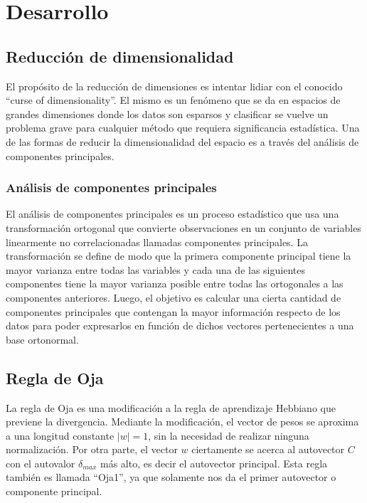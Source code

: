 \documentclass[informe.tex]{subfiles}
\begin{document}
  
  \section{Desarrollo}
    \subsection{Reducción de dimensionalidad}
	El propósito de la reducción de dimensiones es intentar lidiar con el conocido ``curse of dimensionality''. El mismo es un fenómeno que se da en espacios de grandes dimensiones donde los datos son esparsos y clasificar se vuelve un problema grave para cualquier método que requiera significancia estadística. Una de las formas de reducir la dimensionalidad del espacio es a través del análisis de componentes principales.
    
      \subsubsection{Análisis de componentes principales}
	El an\'alisis de componentes principales es un proceso estadístico que usa una transformaci\'on ortogonal que convierte observaciones en un conjunto de variables linearmente no correlacionadas llamadas componentes principales. La transformación se define de modo que la primera componente principal tiene la mayor varianza entre todas las variables y cada una de las siguientes componentes tiene la mayor varianza posible entre todas las ortogonales a las componentes anteriores. Luego, el objetivo es calcular una cierta cantidad de componentes principales que contengan la mayor información respecto de los datos para poder expresarlos en función de dichos vectores pertenecientes a una base ortonormal.
	
      \subsection{Regla de Oja}
	La regla de Oja es una modificación a la regla de aprendizaje Hebbiano que previene la divergencia. Mediante la modificación, el vector de pesos se aproxima a una longitud constante $|w|=1$, sin la necesidad de realizar ninguna normalización. Por otra parte, el vector $w$ ciertamente se acerca al autovector $C$ con el autovalor $\delta_{max}$ más alto, es decir el autovector principal. Esta regla también es llamada ``Oja1'', ya que solamente nos da el primer autovector o componente principal.
	
	~
	
\end{document}
